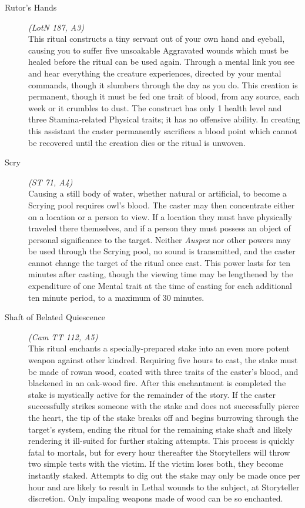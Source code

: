 \begin{description}
	\item[Rutor's Hands] \emph{(LotN 187, A3)} \hfill \\
	This ritual constructs a tiny servant out of your own hand and eyeball, causing you to suffer five unsoakable Aggravated wounds 
	which must be healed before the ritual can be used again.  Through a mental link you see and hear everything the creature 
	experiences, directed by your mental commands, though it slumbers through the day as you do.  This creation is permanent, 
	though it must be fed one trait of blood, from any source, each week or it crumbles to dust.  The construct has only 1 health 
	level and three Stamina-related Physical traits; it has no offensive ability.  In creating this assistant the caster permanently 
	sacrifices a blood point which cannot be recovered until the creation dies or the ritual is unwoven. \\

	\item[Scry] \emph{(ST 71, A4)} \hfill \\
	Causing a still body of water, whether natural or artificial, to become a Scrying pool requires owl's blood.  The caster may then 
	concentrate either on a location or a person to view.  If a location they must have physically traveled there themselves, and if 
	a person they must possess an object of personal significance to the target.  Neither \emph{Auspex} nor other powers may be used 
	through the Scrying pool, no sound is transmitted, and the caster cannot change the target of the ritual once cast.  This power 
	lasts for ten minutes after casting, though the viewing time may be lengthened by the expenditure of one Mental trait 
	at the time of casting for each additional ten minute period, to a maximum of 30 minutes. \\

	\item[Shaft of Belated Quiescence] \emph{(Cam TT 112, A5)} \hfill \\
	This ritual enchants a specially-prepared stake into an even more potent weapon against other kindred.  Requiring five hours to 
	cast, the stake must be made of rowan wood, coated with three traits of the caster's blood, and blackened in an oak-wood fire.  
	After this enchantment is completed the stake is mystically active for the remainder of the story.  If the caster successfully 
	strikes someone with the stake and does not successfully pierce the heart, the tip of the stake breaks off and begins burrowing 
	through the target's system, ending the ritual for the remaining stake shaft and likely rendering it ill-suited for further staking 
	attempts.  This process is quickly fatal to mortals, but for every hour thereafter the Storytellers will throw two simple tests 
	with the victim.  If the victim loses both, they become instantly staked.  Attempts to dig out the stake may only be made once 
	per hour and are likely to result in Lethal wounds to the subject, at Storyteller discretion.  Only impaling weapons made of 
	wood can be so enchanted. \\


\end{description}
